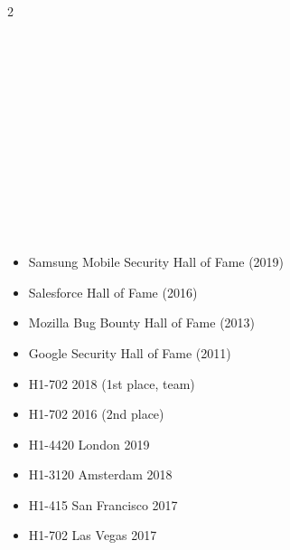 \documentclass[10pt,a4paper,ragged2e,withhyper]{altacv}
\begin{document}
\begin{paracol}{2}

\\
\\
\\
\\
\\
\\
\\
\\
\\
\\

\vspace{0.5em}


\\

\vspace{0.5em}




\begin{itemize}
\item Samsung Mobile Security Hall of Fame (2019)
\item Salesforce Hall of Fame (2016)
\item Mozilla Bug Bounty Hall of Fame (2013)
\item Google Security Hall of Fame (2011)
\end{itemize}

\vspace{0.5em}

\begin{itemize}
\item H1-702 2018 (1st place, team)
\item H1-702 2016 (2nd place)
\item H1-4420 London 2019
\item H1-3120 Amsterdam 2018
\item H1-415 San Francisco 2017
\item H1-702 Las Vegas 2017
\end{itemize}


\end{paracol}
\end{document}
